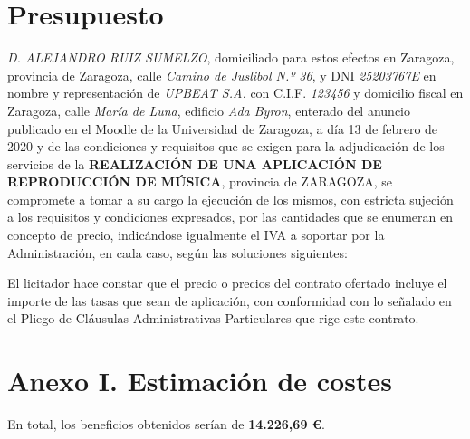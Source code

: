 \documentclass{article}
\begin{document}
\section{Presupuesto}
\textit{D. ALEJANDRO RUIZ SUMELZO}, domiciliado para estos efectos en Zaragoza, provincia de Zaragoza, calle \textit{Camino de Juslibol N.º 36}, y DNI \textit{25203767E} en nombre y representación de \textit{UPBEAT S.A.} con C.I.F. \textit{123456} y domicilio fiscal en Zaragoza, calle \textit{María de Luna}, edificio \textit{Ada Byron}, enterado del anuncio publicado en el Moodle de la Universidad de Zaragoza, a día 13 de febrero de 2020 y de las condiciones y requisitos que se exigen para la adjudicación de los servicios de la \textbf{REALIZACIÓN DE UNA APLICACIÓN DE REPRODUCCIÓN DE MÚSICA}, provincia de ZARAGOZA, se compromete a tomar a su cargo la ejecución de los mismos, con estricta sujeción a los requisitos y condiciones expresados, por las cantidades que se enumeran en concepto de precio, indicándose igualmente el IVA a soportar por la Administración, en cada caso, según las soluciones siguientes:

\begin{figure}[H]
\end{figure}

El licitador hace constar que el precio o precios del contrato ofertado incluye el importe de las tasas que sean de aplicación, con conformidad con lo señalado en el Pliego de Cláusulas Administrativas Particulares que rige este contrato. 
\newpage
\section*{Anexo I. Estimación de costes}
\begin{figure}[H]
\end{figure}

En total, los beneficios obtenidos serían de \textbf{14.226,69 \euro}.
\end{document}
